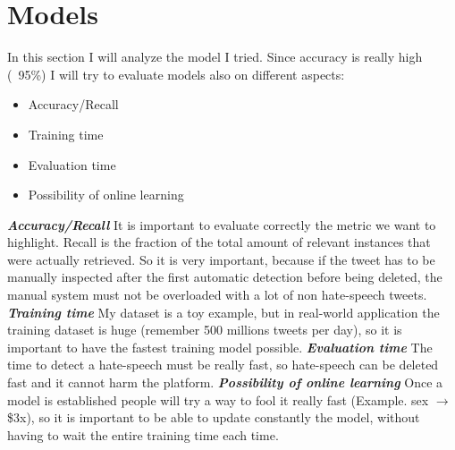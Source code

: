 \documentclass[12pt]{article}
\begin{document}
\section{Models}
In this section I will analyze the model I tried. Since accuracy is really high (~95\%) I will try to evaluate models also on different aspects:
\begin{itemize}
    \item Accuracy/Recall
    \item Training time
    \item Evaluation time
    \item Possibility of online learning
\end{itemize}
\textbf{\textit{Accuracy/Recall}} It is important to evaluate correctly the metric we want to highlight.
Recall is the fraction of the total amount of relevant instances that were actually retrieved. So it is very important, because if the tweet has to be manually inspected after the first automatic detection before being deleted, the manual system must not be overloaded with a lot of non hate-speech tweets.
\newline
\textbf{\textit{Training time}} My dataset is a toy example, but in real-world application the training dataset is huge (remember 500 millions tweets per day), so it is important to have the fastest training model possible.
\newline
\textbf{\textit{Evaluation time}} The time to detect a hate-speech must be really fast, so hate-speech can be deleted fast and it cannot harm the platform.
\newline
\textbf{\textit{Possibility of online learning}} Once a model is established people will try a way to fool it really fast (Example. sex $\rightarrow$ \$3x), so it is important to be able to update constantly the model, without having to wait the entire training time each time.  
\end{document}
